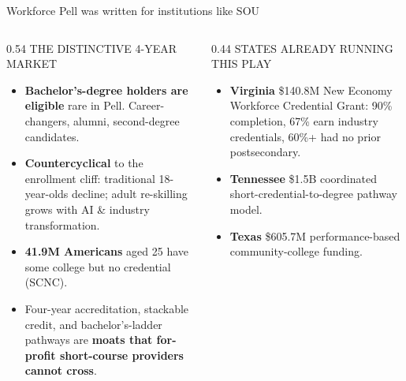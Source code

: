 \documentclass[aspectratio=169,11pt]{beamer}
\newcommand{\eyebrow}[1]{%
  {\sffamily\fontsize{7.5pt}{9pt}\selectfont
   \color{textMuted}%
   \MakeUppercase{#1}%
  }%
}
\newcommand{\theEyebrowText}{}
\newcommand{\frametitleEyebrow}[1]{\renewcommand{\theEyebrowText}{#1}}
\begin{document}
\frametitleEyebrow{Position / why 4-year universities, and the proof}
\begin{frame}{Workforce Pell was written for institutions like SOU}
  \begin{columns}[T,onlytextwidth]
    \begin{column}{0.54\textwidth}
      \rmfamily\fontsize{10.5pt}{13.5pt}\selectfont
      \color{textPrimary}
      \eyebrow{the distinctive 4-year market}
      \vspace{4pt}
      \begin{itemize}\itemsep2pt
        \item \textbf{Bachelor's-degree holders are eligible} \textemdash{}
              rare in Pell. Career-changers, alumni, second-degree
              candidates.
        \item \textbf{Countercyclical} to the enrollment cliff:
              traditional 18-year-olds decline; adult re-skilling
              grows with AI \& industry transformation.
        \item \textbf{41.9M Americans} aged 25 have
              some college but no credential (SCNC).
        \item Four-year accreditation, stackable credit, and
              bachelor's-ladder pathways are \textbf{moats that
              for-profit short-course providers cannot cross}.
      \end{itemize}
    \end{column}
    \begin{column}{0.44\textwidth}
      \rmfamily\fontsize{9.6pt}{12.4pt}\selectfont
      \color{textPrimary}
      \eyebrow{states already running this play}
      \vspace{4pt}
      \begin{itemize}\itemsep2pt
        \item \textbf{Virginia} \textemdash{} \$140.8M New Economy
              Workforce Credential Grant: 90\% completion, 67\%
              earn industry credentials, 60\%+ had no prior
              postsecondary.
        \item \textbf{Tennessee} \textemdash{} \$1.5B coordinated
              short-credential-to-degree pathway model.
        \item \textbf{Texas} \textemdash{} \$605.7M
              performance-based community-college funding.

\end{itemize}
\end{column}
\end{columns}
\end{frame}
\end{document}
